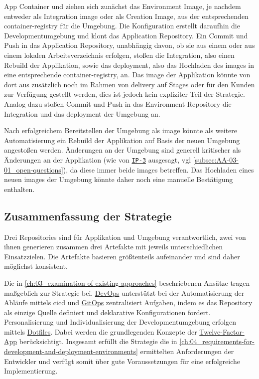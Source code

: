 App Container und   ziehen sich zunächst das Environment Image, je nachdem entweder als Integration \Gls{image} oder als Creation Image, aus der entsprechenden \Gls{container-registry} für die Umgebung. Die  Konfiguration erstellt daraufhin die Developmentumgebung und  klont das Application Repository. Ein  Commit und Push in das Application Repository, unabhängig davon, ob sie aus einem  oder aus einem lokalen Arbeitsverzeichnis erfolgen, stoßen  die Integration, also einen Rebuild der Applikation, sowie  das \Gls{deployment}, also das Hochladen des \Glspl{image} in eine entsprechende \Gls{container-registry}, an. Das \Gls{image} der Applikation könnte von dort aus zusätzlich noch im Rahmen von \Gls{delivery} auf Stages oder für den Kunden zur Verfügung gestellt werden, dies ist jedoch kein expliziter Teil der  Strategie. Analog dazu stoßen  Commit und Push in das Environment Repository  die Integration und  das \Gls{deployment} der Umgebung an.

Nach erfolgreichem Bereitstellen der Umgebung als \Gls{image} könnte als weitere Automatisierung ein Rebuild der Applikation auf Basis der neuen Umgebung angestoßen werden. Änderungen an der Umgebung sind generell kritischer als Änderungen an der Applikation (wie von \texttt{\hyperref[sec:AA-02_interview-persons]{IP-3}} ausgesagt, \acrshort{vgl} \autoref{subsec:AA-03-01_open-questions}), da diese immer beide \Glspl{image} betreffen. Das Hochladen eines neuen \Glspl{image} der Umgebung könnte daher noch eine manuelle Bestätigung enthalten. 

\subsection{Zusammenfassung der Strategie}
\label{subsec:05-02-04_summary-of-strategy}

Drei Repositories sind für Applikation und Umgebung verantwortlich, zwei von ihnen generieren zusammen drei Artefakte mit jeweils unterschiedlichen Einsatzzielen. Die Artefakte basieren größtenteils aufeinander und sind daher möglichst konsistent.

Die in \autoref{ch:03_examination-of-existing-approaches} beschriebenen Ansätze tragen maßgeblich zur  Strategie bei. \hyperref[sec:03-01_devops]{DevOps} unterstützt bei der Automatisierung der Abläufe mittels \Gls{cicd} und \hyperref[sec:03-03_gitops]{GitOps} zentralisiert Aufgaben, indem es das Repository als einzige Quelle definiert und deklarative Konfigurationen fordert. Personalisierung und Individualisierung der Developmentumgebung erfolgen mittels \hyperref[sec:03-04_dotfiles]{Dotfiles}. Dabei werden die grundlegenden Konzepte der \hyperref[sec:03-05_concept-of-twelve-factor-app]{Twelve-Factor-App} berücksichtigt. Insgesamt erfüllt die Strategie die in \autoref{ch:04_requirements-for-development-and-deployment-environments} ermittelten Anforderungen der Entwickler und verfügt somit über gute Voraussetzungen für eine erfolgreiche Implementierung.


